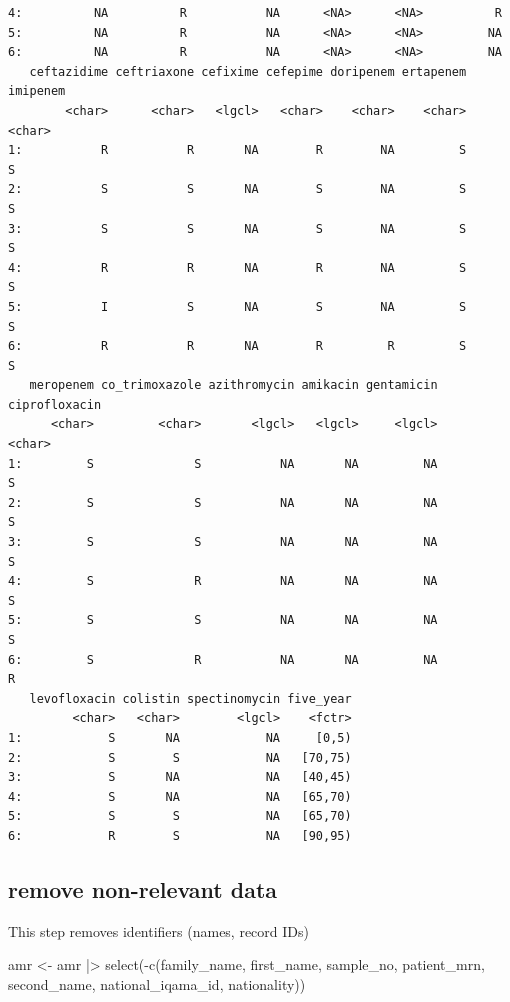 \documentclass[
  letterpaper,
  DIV=11,
  numbers=noendperiod]{scrreprt}
\newenvironment{Shaded}{\begin{snugshade}}{\end{snugshade}}
\newcommand{\FunctionTok}[1]{\textcolor[rgb]{0.28,0.35,0.67}{#1}}
\newcommand{\NormalTok}[1]{\textcolor[rgb]{0.00,0.23,0.31}{#1}}
\newcommand{\OtherTok}[1]{\textcolor[rgb]{0.00,0.23,0.31}{#1}}
\newcommand{\SpecialCharTok}[1]{\textcolor[rgb]{0.37,0.37,0.37}{#1}}
\begin{document}
\begin{verbatim}
4:          NA          R           NA      <NA>      <NA>          R
5:          NA          R           NA      <NA>      <NA>         NA
6:          NA          R           NA      <NA>      <NA>         NA
   ceftazidime ceftriaxone cefixime cefepime doripenem ertapenem imipenem
        <char>      <char>   <lgcl>   <char>    <char>    <char>   <char>
1:           R           R       NA        R        NA         S        S
2:           S           S       NA        S        NA         S        S
3:           S           S       NA        S        NA         S        S
4:           R           R       NA        R        NA         S        S
5:           I           S       NA        S        NA         S        S
6:           R           R       NA        R         R         S        S
   meropenem co_trimoxazole azithromycin amikacin gentamicin ciprofloxacin
      <char>         <char>       <lgcl>   <lgcl>     <lgcl>        <char>
1:         S              S           NA       NA         NA             S
2:         S              S           NA       NA         NA             S
3:         S              S           NA       NA         NA             S
4:         S              R           NA       NA         NA             S
5:         S              S           NA       NA         NA             S
6:         S              R           NA       NA         NA             R
   levofloxacin colistin spectinomycin five_year
         <char>   <char>        <lgcl>    <fctr>
1:            S       NA            NA     [0,5)
2:            S        S            NA   [70,75)
3:            S       NA            NA   [40,45)
4:            S       NA            NA   [65,70)
5:            S        S            NA   [65,70)
6:            R        S            NA   [90,95)
\end{verbatim}

\subsection{remove non-relevant data}\label{remove-non-relevant-data}

This step removes identifiers (names, record IDs)

\begin{Shaded}
\begin{Highlighting}[]
\NormalTok{amr }\OtherTok{\textless{}{-}}\NormalTok{ amr }\SpecialCharTok{|\textgreater{}} \FunctionTok{select}\NormalTok{(}\SpecialCharTok{{-}}\FunctionTok{c}\NormalTok{(family\_name, first\_name, sample\_no, patient\_mrn, second\_name, national\_iqama\_id, nationality))}
\end{Highlighting}
\end{Shaded}
\end{document}
